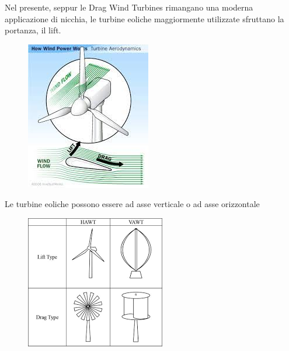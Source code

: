 \documentclass[a4paper, 15pt]{article}
\begin{document}
\begin{adjustwidth}{2in}{}
\begin{figure}[H]
	 	\label{fig:eoliche3}
	 \end{figure}
 	Nel presente, seppur le Drag Wind Turbines rimangano una moderna applicazione di nicchia, le turbine eoliche maggiormente utilizzate sfruttano la portanza, il lift. 
 	\begin{figure}[H]
 		\centering
 		\includegraphics[width=0.3\linewidth]{immagini/eoliche5}
 		\label{fig:eoliche5}
 	\end{figure}
 	Le turbine eoliche possono essere ad asse verticale o ad asse orizzontale
 	\begin{figure}[H]
 		\centering
 		\includegraphics[width=0.5\linewidth]{immagini/eoliche4}
 		\label{fig:eoliche4}
 	\end{figure}	  
\end{adjustwidth}
\end{document}
